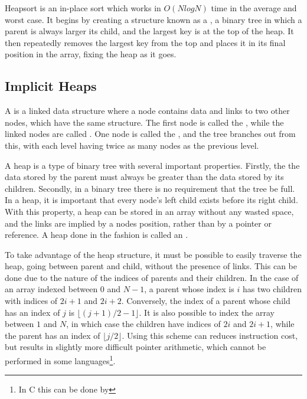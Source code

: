 \label{heap}

Heapsort is an in-place sort which works in $O(NlogN)$ time in the average and
worst case. It begins by creating a structure known as a , a binary tree
in which a parent is always larger its child, and the largest key is at the top
of the heap. It then repeatedly removes the largest key from the top and places
it in its final position in the array, fixing the heap as it goes.

\subsection{Implicit Heaps}

A  is a linked data structure where a node contains data and links
to two other nodes, which have the same structure. The first node is called the
, while the linked nodes are called . One node is called the
, and the tree branches out from this, with each level having twice as many
nodes as the previous level.

A heap is a type of binary tree with several important properties. Firstly, the
the data stored by the parent must always be greater than the data stored by its
children. Secondly, in a binary tree there is no requirement that the tree be full.
In a heap, it is important that every node's left child exists before its right
child. With this property, a heap can be stored in an array without any wasted
space, and the links are implied by a nodes position, rather than by a pointer
or reference. A heap done in the fashion is called an .

To take advantage of the heap structure, it must be possible to easily traverse
the heap, going between parent and child, without the presence of links. This
can be done due to the nature of the indices of parents and their children. In
the case of an array indexed between $0$ and $N-1$, a parent whose index is
$i$ has two children with indices of $2i+1$ and $2i+2$. Conversely, the index of
a parent whose child has an index of $j$ is $\lfloor{}(j+1)/2-1\rfloor{}$. It is
also possible to index the array between $1$ and $N$, in which case the children
have indices of $2i$ and $2i+1$, while the parent has an index of
$\lfloor{}j/2\rfloor{}$. Using this scheme can reduces instruction cost, but
results in slightly more difficult pointer arithmetic, which cannot be performed
in some languages\footnote{In C this can be done by }.

